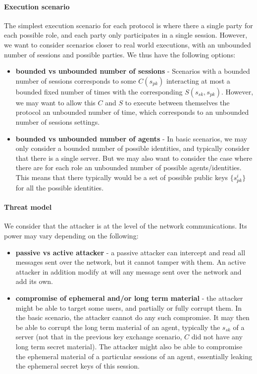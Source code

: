 \documentclass{article}
\newcommand{\sfsk}{\mathit{sk}}
\newcommand{\sfpk}{\mathit{pk}}
\begin{document}
\paragraph{Execution scenario} The simplest execution scenario for each protocol is where there a single party for each possible role, and each party only participates in a single session. However, we want to consider scenarios closer to real world executions, with an unbounded number of sessions and possible parties.
We thus have the following options:
\begin{itemize}
\item \textbf{bounded vs unbounded number of sessions} - Scenarios with a bounded number of sessions corresponds to some $C(s_\sfpk)$ interacting at most a bounded fixed number of times with the corresponding $S(s_\sfsk,s_\sfpk)$. However, we may want to allow this $C$ and $S$ to execute between themselves the protocol an unbounded number of time, which corresponds to an unbounded number of sessions settings.
\item \textbf{bounded vs unbounded number of agents} - In basic scenarios, we may only consider a bounded number of possible identities, and typically consider that there is a single server. But we may also want to consider the case where there are for each role an unbounded number of possible agents/identities. This means that there typically would be a set of possible public keys $\{s_\sfpk^i\}$ for all the possible identities.
\end{itemize}


\paragraph{Threat model}

We consider that the attacker is at the level of the network communications. Its power may vary depending on the following:

\begin{itemize}
\item \textbf{passive vs active attacker} - a passive attacker can intercept and read all messages sent over the network, but it cannot tamper with them. An active attacker in addition modify at will any message sent over the network and add its own.
  \item \textbf{compromise of ephemeral and/or long term material} - the attacker might be able to target some users, and partially or fully corrupt them. In the basic scenario, the attacker cannot do any such compromise. It may then be able to corrupt the long term material of an agent, typically the $s_\sfsk$ of a server (not that in the previous key exchange scenario, $C$ did not have any long term secret material).  The attacker might also be able to compromise the ephemeral material of a particular sessions of an agent, essentially leaking the ephemeral secret keys of this session.
 \end{itemize}
\end{document}
